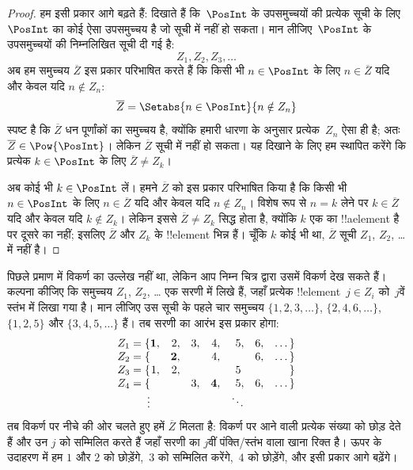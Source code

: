\documentclass[../../../include/open-logic-section]{subfiles}
\begin{document}
\begin{proof}
हम इसी प्रकार आगे बढ़ते हैं: दिखाते हैं कि~$\PosInt$ के उपसमुच्चयों की
प्रत्येक सूची के लिए $\PosInt$ का कोई ऐसा उपसमुच्चय है जो सूची में नहीं हो
सकता। मान लीजिए~$\PosInt$ के उपसमुच्चयों की निम्नलिखित सूची दी गई है:
\[
Z_{1}, Z_{2}, Z_{3}, \dots
\]
अब हम समुच्चय $\overline{Z}$ इस प्रकार परिभाषित करते हैं कि किसी भी
$n \in \PosInt$ के लिए $n \in \overline{Z}$ यदि और केवल यदि
$n \notin Z_{n}$:
\[
\overline{Z} = \Setabs{n \in \PosInt}{n \notin Z_n}
\]
स्पष्ट है कि $\overline{Z}$ धन पूर्णांकों का समुच्चय है, क्योंकि हमारी
धारणा के अनुसार प्रत्येक~$Z_n$ ऐसा ही है; अतः $\overline{Z} \in
\Pow{\PosInt}$। लेकिन $\overline{Z}$ सूची में नहीं हो सकता। यह दिखाने के लिए
हम स्थापित करेंगे कि प्रत्येक $k \in \PosInt$ के लिए $\overline{Z} \neq
Z_k$।

अब कोई भी $k \in \PosInt$ लें। हमने $\overline{Z}$ को इस प्रकार परिभाषित
किया है कि किसी भी $n \in \PosInt$ के लिए $n \in \overline{Z}$ यदि और केवल
यदि $n \notin Z_n$। विशेष रूप से $n=k$ लेने पर $k \in \overline{Z}$ यदि और
केवल यदि $k \notin Z_k$। लेकिन इससे $\overline{Z} \neq Z_k$ सिद्ध होता है,
क्योंकि $k$ एक का !!a{element} है पर दूसरे का नहीं; इसलिए $\overline{Z}$ और
$Z_k$ के !!{element} भिन्न हैं। चूँकि $k$ कोई भी था, $\overline{Z}$ सूची
$Z_1$, $Z_2$, \dots{} में नहीं है।
\end{proof}

\begin{explain}
पिछले प्रमाण में विकर्ण का उल्लेख नहीं था, लेकिन आप निम्न चित्र द्वारा उसमें
विकर्ण देख सकते हैं। कल्पना कीजिए कि समुच्चय $Z_1$, $Z_2$, \dots{} एक सरणी
में लिखे हैं, जहाँ प्रत्येक !!{element}~$j \in Z_i$ को~$j$वें स्तंभ में लिखा
गया है। मान लीजिए उस सूची के पहले चार समुच्चय $\{1,2,3,\dots\}$,
$\{2, 4, 6, \dots\}$, $\{1,2,5\}$ और $\{3,4,5,\dots\}$ हैं। तब सरणी का
आरंभ इस प्रकार होगा:
\[
\begin{array}{r@{}rrrrrrr}
  Z_1 = \{ & \mathbf{1}, & 2, & 3, & 4, & 5, & 6, & \dots\}\\
  Z_2 = \{ &  & \mathbf{2}, &  & 4, &  & 6, & \dots\}\\
  Z_3 = \{ & 1, & 2, &  &  & 5\phantom{,} &  & \}\\
  Z_4 = \{ &  &  & 3, & \mathbf{4}, & 5, & 6, & \dots\}\\
  \vdots & & & & & \ddots
\end{array}
\]
तब विकर्ण पर नीचे की ओर चलते हुए हमें $\overline{Z}$ मिलता है: विकर्ण पर
आने वाली प्रत्येक संख्या को छोड़ देते हैं और उन $j$ को सम्मिलित करते हैं
जहाँ सरणी का $j$वीं पंक्ति/स्तंभ वाला खाना रिक्त है। ऊपर के उदाहरण
में हम $1$ और $2$ को छोड़ेंगे,~$3$ को सम्मिलित करेंगे,~$4$ को छोड़ेंगे, और
इसी प्रकार आगे बढ़ेंगे।
\end{explain}
\end{document}

